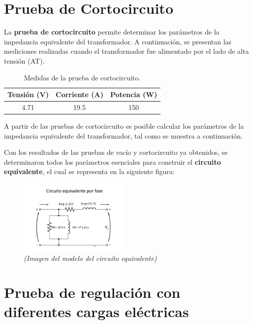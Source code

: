 \section{Prueba de Cortocircuito}
La \textbf{prueba de cortocircuito} permite determinar los parámetros de la impedancia equivalente del transformador. A continuación, se presentan las mediciones realizadas cuando el transformador fue alimentado por el lado de alta tensión (AT).

\begin{table}[h!]
\centering
\caption{Medidas de la prueba de cortocircuito.}
\begin{tabular}{|c|c|c|}
\hline
Tensión (V) & Corriente (A) & Potencia (W) \\ \hline
4.71 & 19.5 & 150 \\ \hline
\end{tabular}
\end{table}

A partir de las pruebas de cortocircuito es posible calcular los parámetros de la impedancia equivalente del transformador, tal como se muestra a continuación.

\vspace{1em}
Con los resultados de las pruebas de vacío y cortocircuito ya obtenidos, se determinaron todos los parámetros esenciales para construir el \textbf{circuito equivalente}, el cual se representa en la siguiente figura:

\begin{figure}[h!] %
    \centering
    \includegraphics[width=0.48\textwidth]{figs/CE.jpeg} %
    \caption{\textit{(Imagen del modelo del circuito equivalente)}}
    \label{fig:mi_imagen1}
\end{figure}


\section{Prueba de regulación con diferentes cargas eléctricas}

